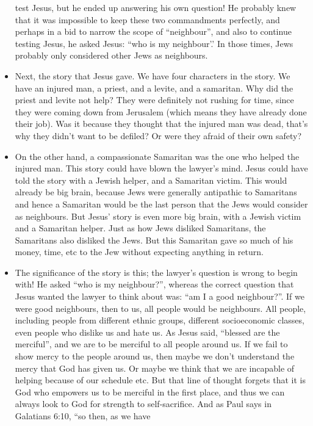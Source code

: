 \begin{itemize}
{  test Jesus, but he ended up answering his own question! He probably knew
  that it was impossible to keep these two commandments perfectly, and
  perhaps in a bid to narrow the scope of ``neighbour'', and also to continue
  testing Jesus, he asked Jesus: ``who is my neighbour'.' In those times,
  Jews probably only considered other Jews as neighbours.}
  \item{Next, the story that Jesus gave. We have four characters in the
  story. We have an injured man, a priest, and a levite, and a samaritan. Why
  did the priest and levite not help? They were definitely not rushing for
  time, since they were coming down from Jerusalem (which means they have
  already done their job). Was it because they thought that the injured man
  was dead, that's why they didn't want to be defiled? Or were they afraid of
  their own safety?}
  \item{On the other hand, a compassionate Samaritan was the one who helped
  the injured man. This story could have blown the lawyer's mind. Jesus could
  have told the story with a Jewish helper, and a Samaritan victim. This
  would already be big brain, because Jews were generally antipathic to
  Samaritans and hence a Samaritan would be the last person that the Jews
  would consider as neighbours. But Jesus' story is even more big brain, with
  a Jewish victim and a Samaritan helper. Just as how Jews disliked
  Samaritans, the Samaritans also disliked the Jews. But this Samaritan gave
  so much of his money, time, etc to the Jew without expecting anything in
  return.}
  \item{The significance of the story is this; the lawyer's question is wrong
  to begin with! He asked ``who is my neighbour?'', whereas the correct
  question that Jesus wanted the lawyer to think about was: ``am I a good
  neighbour?''. If we were good neighbours, then to us, all people would be
  neighbours. All people, including people from different ethnic groups,
  different socioeconomic classes, even people who dislike us and hate us. As
  Jesus said, ``blessed are the merciful'', and we are to be merciful to all
  people around us. If we fail to show mercy to the people around us, then
  maybe we don't understand the mercy that God has given us. Or maybe we
  think that we are incapable of helping because of our schedule etc. But
  that line of thought forgets that it is God who empowers us to be merciful
  in the first place, and thus we can always look to God for strength to
  self-sacrifice. And as Paul says in Galatians 6:10, ``so then, as we have
}
\end{itemize}
